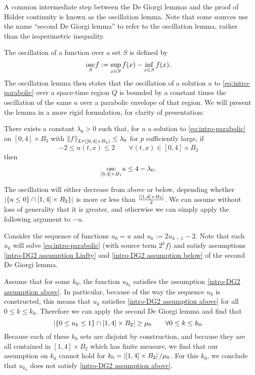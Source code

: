 
A common intermediate step between the De Giorgi lemmas and the proof of H\"{o}lder continuity is known as the oscillation lemma.  Note that some sources use the name ``second De Giorgi lemma'' to refer to the oscillation lemma, rather than the isoperimetric inequality.  

The oscillation of a function over a set $S$ is defined by 
\[ \underset{S}{\operatorname{osc}} f := \sup_{x \in S} f(x) - \inf_{x \in S} f(x). \]
The oscillation lemma then states that the oscillation of a solution $u$ to \eqref{eq:intro-parabolic} over a space-time region $Q$ is bounded by a constant times the oscillation of the same $u$ over a parabolic envelope of that region.  We will present the lemma in a more rigid formulation, for clarity of presentation:
\begin{lemma}
There exists a constant $\lambda_0 > 0$ such that, for $u$ a solution to \eqref{eq:intro-parabolic} on $[0,4]\times B_3$ with $\left\lVert f\right\rVert_{L^p([0,4]\times B_3)} \leq \lambda_0$ for $p$ sufficiently large, if
\[ -2 \leq u(t,x) \leq 2 \qquad \forall (t,x) \in [0,4] \times B_3 \]
then 
\[ \underset{[3,4] \times B_1}{\operatorname{osc}} u \leq 4-\lambda_0. \]
\end{lemma}

The oscillation will either decrease from above or below, depending whether $\left\lvert \{u \leq 0\} \cap [1,4]\times B_2\} \right\rvert$ is more or less than $\frac{\left\lvert [1,4]\times B_2 \right\rvert}{2}$.  We can assume without loss of generality that it is greater, and otherwise we can simply apply the following argument to $-u$.  

Consider the sequence of functions $u_0 = u$ and $u_k := 2u_{k-1} - 2$.  Note that each $u_k$ will solve \eqref{eq:intro-parabolic} (with source term $2^k f$) and satisfy assumptions \eqref{intro-DG2 assumption Linfty} and \eqref{intro-DG2 assumption below} of the second De Giorgi lemma.  

Assume that for some $k_0$, the function $u_{k_0}$ satisfies the assumption \eqref{intro-DG2 assumption above}.  In particular, because of the way the sequence $u_k$ is constructed, this means that $u_k$ satisfies \eqref{intro-DG2 assumption above} for all $0 \leq k \leq k_0$.  Therefore we can apply the second De Giorgi lemma and find that 
\[ \left\lvert \{0 \leq u_k \leq 1\} \cap [1,4] \times B_2 \right\rvert \geq \mu_0 \qquad \forall 0 \leq k \leq k_0. \]
Because each of these $k_0$ sets are disjoint by construction, and because they are all contained in $[1,4]\times B_2$ which has finite measure, we find that our assumption on $k_0$ cannot hold for $k_0 = \left\lvert [1,4]\times B_2 \right\rvert / \mu_0$.  For this $k_0$, we conclude that $u_{k_0}$ does not satisfy \eqref{intro-DG2 assumption above}.  

